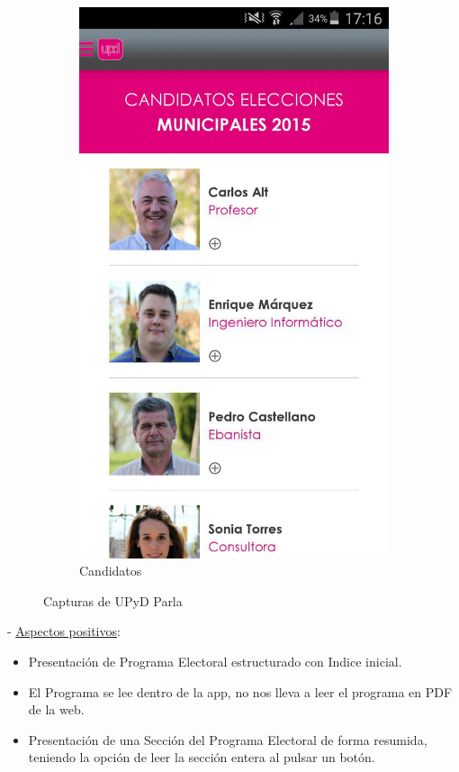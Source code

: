 \begin{figure}[H]
\begin{subfigure}[b]{0.3\textwidth}
                \includegraphics[width=\textwidth]{Media/Captures/UPyDParlaCandidates.jpg}
                \caption{Candidatos}
                \label{fig:upydCandidates}
        \end{subfigure}
        \caption{Capturas de UPyD Parla}\label{fig:upydCaptures}
\end{figure}

 - \underline{Aspectos positivos}:

\begin{itemize}
	\item Presentación de Programa Electoral estructurado con Indice inicial.
	\item El Programa se lee dentro de la app, no nos lleva a leer el programa en PDF de la web. 
	\item Presentación de una Sección del Programa Electoral de forma resumida, teniendo la opción de leer la sección entera al pulsar un botón.
\end{itemize}

